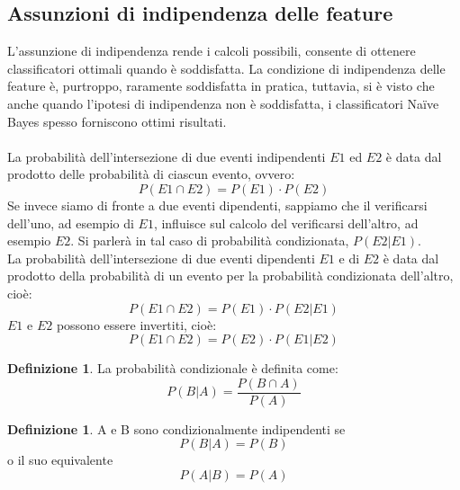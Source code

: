 \documentclass{article}
\theoremstyle{plain}
\theoremstyle{definition}
\newtheorem{defn}[]{Definizione} %
\begin{document}
\subsection{Assunzioni di indipendenza delle feature}
L'assunzione di indipendenza rende i calcoli possibili, consente di ottenere classificatori ottimali quando è soddisfatta. La condizione di indipendenza delle feature è, purtroppo, raramente soddisfatta in pratica, tuttavia, si è visto che anche quando l'ipotesi di indipendenza non è soddisfatta, i classificatori Naïve Bayes spesso forniscono ottimi risultati.
\\
\\
La probabilità dell'intersezione di due eventi indipendenti $E1$ ed $E2$ è data dal prodotto delle probabilità di ciascun evento, ovvero:
$$ P(E1 \cap E2) = P(E1) \cdot P(E2)$$
Se invece siamo di fronte a due eventi dipendenti, sappiamo che il verificarsi dell'uno, ad esempio di $E1$, influisce sul calcolo del verificarsi dell'altro, ad esempio $E2$. Si parlerà in tal caso di probabilità condizionata, $P(E2|E1)$.
\\
La probabilità dell'intersezione di due eventi dipendenti $E1$ e di $E2$ è data dal prodotto della probabilità di un evento per la probabilità condizionata dell'altro, cioè: 
$$ P(E1 \cap E2) = P(E1) \cdot P(E2|E1)$$
$E1$ e $E2$ possono essere invertiti, cioè:
$$ P(E1 \cap E2) = P(E2) \cdot P(E1|E2)$$

\begin{defn}
	La probabilità condizionale è definita come: $$P(B|A)=\frac{P(B \cap A)}{P(A)}$$
\end{defn}
\begin{defn}
	A e B sono condizionalmente indipendenti se $$P(B|A)=P(B)$$ o il suo equivalente $$P(A|B)=P(A)$$
\end{defn}
\end{document}
